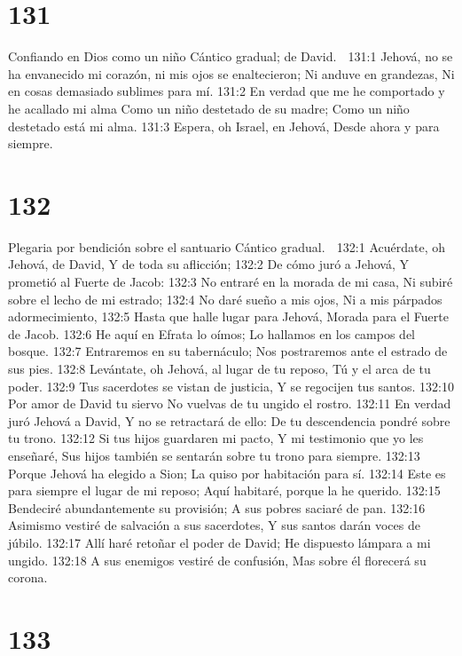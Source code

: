 \chapter{131}

Confiando en Dios como un niño 
Cántico gradual; de David. 

131:1 Jehová, no se ha envanecido mi corazón, ni mis ojos se enaltecieron; 
Ni anduve en grandezas, 
Ni en cosas demasiado sublimes para mí. 
131:2 En verdad que me he comportado y he acallado mi alma 
Como un niño destetado de su madre; 
Como un niño destetado está mi alma. 
131:3 Espera, oh Israel, en Jehová, 
Desde ahora y para siempre. 

\chapter{132}

Plegaria por bendición sobre el santuario 
Cántico gradual. 

132:1 Acuérdate, oh Jehová, de David, 
Y de toda su aflicción; 
132:2 De cómo juró a Jehová, 
Y prometió al Fuerte de Jacob: 
132:3 No entraré en la morada de mi casa, 
Ni subiré sobre el lecho de mi estrado; 
132:4 No daré sueño a mis ojos, 
Ni a mis párpados adormecimiento, 
132:5 Hasta que halle lugar para Jehová, 
Morada para el Fuerte de Jacob. 
132:6 He aquí en Efrata lo oímos; 
Lo hallamos en los campos del bosque. 
132:7 Entraremos en su tabernáculo; 
Nos postraremos ante el estrado de sus pies. 
132:8 Levántate, oh Jehová, al lugar de tu reposo, 
Tú y el arca de tu poder. 
132:9 Tus sacerdotes se vistan de justicia, 
Y se regocijen tus santos. 
132:10 Por amor de David tu siervo 
No vuelvas de tu ungido el rostro. 
132:11 En verdad juró Jehová a David, 
Y no se retractará de ello: 
De tu descendencia pondré sobre tu trono. 
132:12 Si tus hijos guardaren mi pacto, 
Y mi testimonio que yo les enseñaré, 
Sus hijos también se sentarán sobre tu trono para siempre. 
132:13 Porque Jehová ha elegido a Sion; 
La quiso por habitación para sí. 
132:14 Este es para siempre el lugar de mi reposo; 
Aquí habitaré, porque la he querido. 
132:15 Bendeciré abundantemente su provisión; 
A sus pobres saciaré de pan. 
132:16 Asimismo vestiré de salvación a sus sacerdotes, 
Y sus santos darán voces de júbilo. 
132:17 Allí haré retoñar el poder de David; 
He dispuesto lámpara a mi ungido. 
132:18 A sus enemigos vestiré de confusión, 
Mas sobre él florecerá su corona. 

\chapter{133}

